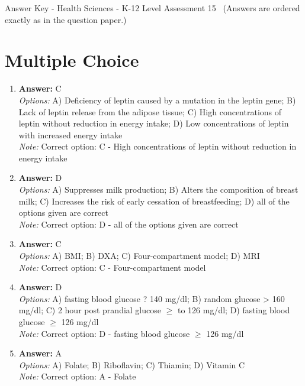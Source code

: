 \documentclass[12pt]{article}
\begin{document}
\begin{center}
Answer Key - Health Sciences - K-12 Level Assessment 15 \
\small (Answers are ordered exactly as in the question paper.)
\end{center}

\section*{Multiple Choice}
\begin{enumerate}[label=\arabic*.]
\item \textbf{Answer:} C
\\ \textit{Options:} A) Deficiency of leptin caused by a mutation in the leptin gene; B) Lack of leptin release from the adipose tissue; C) High concentrations of leptin without reduction in energy intake; D) Low concentrations of leptin with increased energy intake
\\ \textit{Note:} Correct option: C - High concentrations of leptin without reduction in energy intake
\item \textbf{Answer:} D
\\ \textit{Options:} A) Suppresses milk production; B) Alters the composition of breast milk; C) Increases the risk of early cessation of breastfeeding; D) all of the options given are correct
\\ \textit{Note:} Correct option: D - all of the options given are correct
\item \textbf{Answer:} C
\\ \textit{Options:} A) BMI; B) DXA; C) Four-compartment model; D) MRI
\\ \textit{Note:} Correct option: C - Four-compartment model
\item \textbf{Answer:} D
\\ \textit{Options:} A) fasting blood glucose ? 140 mg/dl; B) random glucose \textgreater{} 160 mg/dl; C) 2 hour post prandial glucose \ensuremath{\geq} to 126 mg/dl; D) fasting blood glucose \ensuremath{\geq} 126 mg/dl
\\ \textit{Note:} Correct option: D - fasting blood glucose \ensuremath{\geq} 126 mg/dl
\item \textbf{Answer:} A
\\ \textit{Options:} A) Folate; B) Riboflavin; C) Thiamin; D) Vitamin C
\\ \textit{Note:} Correct option: A - Folate
\end{enumerate}
\end{document}
